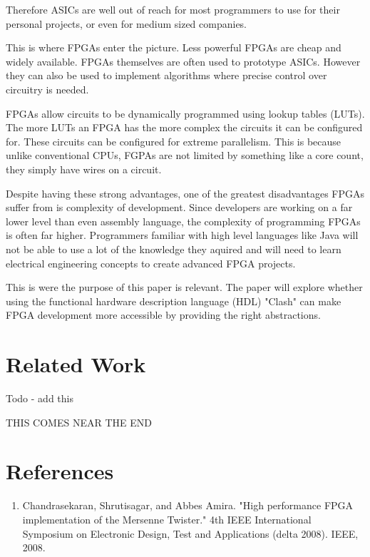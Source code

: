 \documentclass{article}
\begin{document}
\begin{multicols}{2}
    Therefore ASICs are well out of reach for most programmers to use for their personal projects, or even for
    medium sized companies.

    This is where FPGAs enter the picture. Less powerful FPGAs are cheap and widely available. FPGAs themselves
    are often used to prototype ASICs. However they can also be used to implement algorithms where precise control
    over circuitry is needed.

    FPGAs allow circuits to be dynamically programmed using lookup tables (LUTs). The more LUTs an FPGA
    has the more complex the circuits it can be configured for. These circuits can be configured for
    extreme parallelism. This is because unlike conventional CPUs, FGPAs are not limited by something like a core count,
    they simply have wires on a circuit.

    Despite having these strong advantages, one of the greatest disadvantages FPGAs suffer from is complexity of development.
    Since developers are working on a far lower level than even assembly language, the complexity
    of programming FPGAs is often far higher. Programmers familiar with high level languages
    like Java will not be able to use a lot of the knowledge they aquired and will need to learn electrical engineering
    concepts to create advanced FPGA projects.

    This is were the purpose of this paper is relevant. The paper will explore whether using the
    functional hardware description language (HDL) "Clash" can make FPGA development more accessible by providing
    the right abstractions.    
    
    \section{Related Work}

    Todo - add this

    THIS COMES NEAR THE END

    
    \end{multicols}

    \break
    \section*{References}

    \begin{enumerate}

    \item Chandrasekaran, Shrutisagar, and Abbes Amira. "High performance FPGA implementation of the Mersenne Twister." 4th IEEE International Symposium on Electronic Design, Test and Applications (delta 2008). IEEE, 2008.

    \end{enumerate}
    
\end{document}
